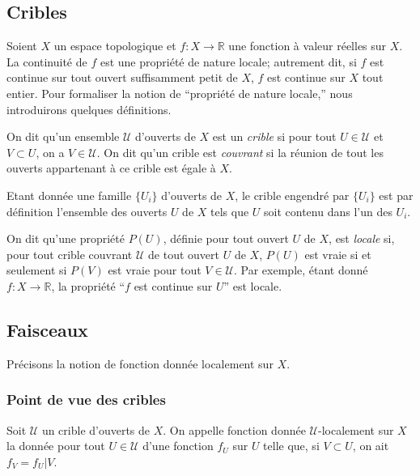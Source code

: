 \documentclass{article}
\newcommand{\cU}{\mathcal{U}}
\newcommand{\dR}{\mathbb{R}}
\begin{document}
\subsection{Cribles}\label{1-1}

Soient $X$ un espace topologique et $f:X\to \dR$ une fonction à valeur 
réelles sur $X$. La continuité de $f$ est une propriété de nature 
locale; autrement dit, si $f$ est continue sur tout ouvert suffisamment petit 
de $X$, $f$ est continue sur $X$ tout entier. Pour formaliser la notion de 
``propriété de nature locale,'' nous introduirons quelques définitions.

On dit qu'un ensemble $\cU$ d'ouverts de $X$ est un \emph{crible} si pour tout 
$U\in\cU$ et $V\subset U$, on a $V\in\cU$. On dit qu'un crible est 
\emph{couvrant} si la réunion de tout les ouverts appartenant à ce crible est 
égale à $X$.

Etant donnée une famille $\{U_i\}$ d'ouverts de $X$, le crible engendré par 
$\{U_i\}$ est par définition l'ensemble des ouverts $U$ de $X$ tels que $U$ 
soit contenu dans l'un des $U_i$. 

On dit qu'une propriété $P(U)$, définie pour tout ouvert $U$ de $X$, est 
\emph{locale} si, pour tout crible couvrant $\cU$ de tout ouvert $U$ de $X$, 
$P(U)$ est vraie si et seulement si $P(V)$ est vraie pour tout $V\in \cU$. Par 
exemple, étant donné $f:X\to \dR$, la propriété ``$f$ est continue sur $U$'' 
est locale. 





\subsection{Faisceaux}\label{1-2}

Précisons la notion de fonction donnée localement sur $X$.





\subsubsection{Point de vue des cribles}\label{1-2-1}

Soit $\cU$ un crible d'ouverts de $X$. On appelle fonction donnée 
$\cU$-localement sur $X$ la donnée pour tout $U\in \cU$ d'une fonction $f_U$ 
sur $U$ telle que, si $V\subset U$, on ait $f_V=f_U|V$. 
\end{document}
